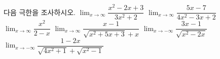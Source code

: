 다음 극한을 조사하시오.
 $\displaystyle\lim_{x\to\infty}\dfrac{x^2-2x+3}{3x^2+2}$
 $\displaystyle\lim_{x\to\infty}\dfrac{5x-7}{4x^2-3x+2}$
 $\displaystyle\lim_{x\to\infty}\dfrac{x^2}{2-x}$
 $\displaystyle\lim_{x\to\infty}\dfrac{x-1}{\sqrt{x^2+5x+3}+x}$
 $\displaystyle\lim_{x\to -\infty}\dfrac{3x-1}{\sqrt{x^2-2x}}$
 $\displaystyle\lim_{x\to -\infty}\dfrac{1-2x}{\sqrt{4x^2+1}+\sqrt{x^2-1}}$
